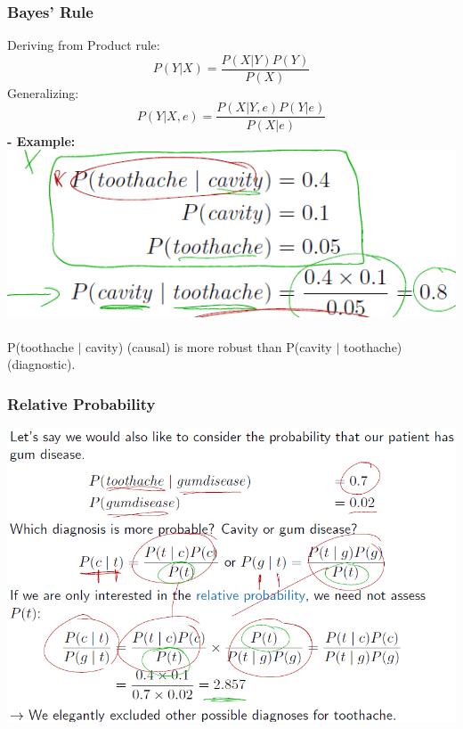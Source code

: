 \documentclass{article}
\begin{document}
\subsubsection{Bayes' Rule}
Deriving from Product rule:\\
\begin{equation}
P(Y|X) = \frac{P(X|Y)P(Y)}{P(X)}
\end{equation}
Generalizing:\\
\begin{equation}
P(Y|X,e) = \frac{P(X|Y,e)P(Y|e)}{P(X|e)}
\end{equation}
\textbf{- Example:}\\
\includegraphics[scale=0.8]{63.png}\\\\
P(toothache $|$ cavity) (causal) is more robust than P(cavity $|$ toothache) (diagnostic).\\

\subsubsection{Relative Probability}
\includegraphics[scale=0.8]{64.png}\\\\
\end{document}
